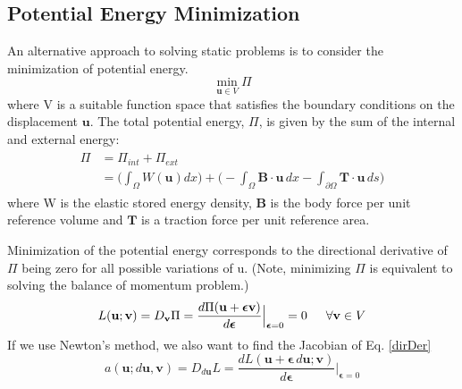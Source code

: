 \documentclass[12pt,3p]{article}
\begin{document}
\subsection{Potential Energy Minimization}
\vspace{-1ex}
An alternative approach to solving static problems is to consider the minimization of potential energy.
\[ \min_{\mathbf{u} \in V} \Pi \]
where V is a suitable function space that satisfies the boundary conditions on the displacement $\mathbf{u}$. The total potential energy, $\Pi$, is given by the sum of the internal and external energy: 
\begin{align}\label{totPotEnergy}
\begin{split}
\Pi &= \Pi_{int} + \Pi_{ext} \\
	&= \bigg( \int_{\Omega} W(\mathbf{u}) dx \bigg) 
	+ \bigg( - \int_{\Omega} \mathbf{B} \cdot \mathbf{u} \, dx 
	- \int_{\partial \Omega} \mathbf{T} \cdot \mathbf{u} \, ds \bigg) 
\end{split}
\end{align}
where W is the elastic stored energy density, $\mathbf{B}$ is the body force per unit reference volume and $\mathbf{T}$ is a traction force per unit reference area. 

Minimization of the potential energy corresponds to the directional derivative of $\Pi$ being zero for all possible variations of u. (Note, minimizing $\Pi$ is equivalent to solving the balance of momentum problem.) 
\begin{equation} \label{dirDer}
L(\mathbf{u};\mathbf{v}) = D_\mathbf{v} \Pi = \frac{d \Pi (\mathbf{u} + \bm{\epsilon} \mathbf{v})}{d \bm{\epsilon}}\Bigr\rvert_{\bm{\epsilon} = 0} = 0 \indent \forall \mathbf{v} \in V
\end{equation}
If we use Newton's method, we also want to find the Jacobian of Eq. \ref{dirDer}
\begin{equation} \label{JacDirDer}
a(\mathbf{u};d\mathbf{u},\mathbf{v}) = D_{d\mathbf{u}} L = \frac{dL(\mathbf{u}+ \bm{\epsilon} \, d\mathbf{u}; \mathbf{v})}{d \bm{\epsilon}} \Bigr\rvert_{\bm{\epsilon} = 0}
\end{equation}

\end{document}
